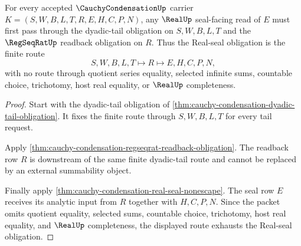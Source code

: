 \begin{theorem}
\label{thm:cauchy-condensation-real-seal-nonescape-obligation}
For every accepted $\CauchyCondensationUp$ carrier $K=(S,W,B,L,T,R,E,H,C,P,N)$, any $\RealUp$ seal-facing read of $E$ must first pass through the dyadic-tail obligation on $S,W,B,L,T$ and the $\RegSeqRatUp$ readback obligation on $R$. Thus the Real-seal obligation is the finite route
$$
S,W,B,L,T \longmapsto R \longmapsto E,H,C,P,N,
$$
with no route through quotient series equality, selected infinite sums, countable choice, trichotomy, host real equality, or $\RealUp$ completeness.
\end{theorem}
\begin{proof}
Start with the dyadic-tail obligation of \autoref{thm:cauchy-condensation-dyadic-tail-obligation}. It fixes the finite route through $S,W,B,L,T$ for every tail request.

Apply \autoref{thm:cauchy-condensation-regseqrat-readback-obligation}. The readback row $R$ is downstream of the same finite dyadic-tail route and cannot be replaced by an external summability object.

Finally apply \autoref{thm:cauchy-condensation-real-seal-nonescape}. The seal row $E$ receives its analytic input from $R$ together with $H,C,P,N$. Since the packet omits quotient equality, selected sums, countable choice, trichotomy, host real equality, and $\RealUp$ completeness, the displayed route exhausts the Real-seal obligation.
\end{proof}

